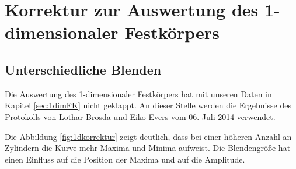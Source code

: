 \section{Korrektur zur Auswertung des 1-dimensionaler Festkörpers}
\subsection{Unterschiedliche Blenden}
Die Auswertung des 1-dimensionaler Festkörpers hat mit unseren Daten in Kapitel
\ref{sec:1dimFK} nicht geklappt.
An dieser Stelle werden die Ergebnisse des Protokolls von Lothar Brosda und
Eiko Evers vom 06. Juli 2014 verwendet.

Die Abbildung \ref{fig:1dkorrektur} zeigt deutlich,
dass bei einer höheren Anzahl an Zylindern die Kurve mehr Maxima und Minima aufweist.
Die Blendengröße hat einen Einfluss auf die Position der Maxima und auf die Amplitude.
